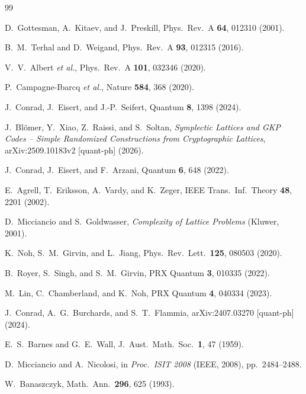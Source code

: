 \documentclass[aps,prl,twocolumn,superscriptaddress]{revtex4-2}
\begin{document}
\begin{thebibliography}{99}

D.~Gottesman, A.~Kitaev, and J.~Preskill,
Phys.~Rev.~A \textbf{64}, 012310 (2001).

B.~M.~Terhal and D.~Weigand,
Phys.~Rev.~A \textbf{93}, 012315 (2016).

V.~V.~Albert \textit{et al.},
Phys.~Rev.~A \textbf{101}, 032346 (2020).

P.~Campagne-Ibarcq \textit{et al.},
Nature \textbf{584}, 368 (2020).

J.~Conrad, J.~Eisert, and J.-P.~Seifert,
Quantum \textbf{8}, 1398 (2024).

J.~Bl\"omer, Y.~Xiao, Z.~Raissi, and S.~Soltan,
\textit{Symplectic Lattices and GKP Codes -- Simple Randomized Constructions from Cryptographic Lattices},
arXiv:2509.10183v2 [quant-ph] (2026).

J.~Conrad, J.~Eisert, and F.~Arzani,
Quantum \textbf{6}, 648 (2022).

E.~Agrell, T.~Eriksson, A.~Vardy, and K.~Zeger,
IEEE Trans.~Inf.~Theory \textbf{48}, 2201 (2002).

D.~Micciancio and S.~Goldwasser,
\textit{Complexity of Lattice Problems} (Kluwer, 2001).

K.~Noh, S.~M.~Girvin, and L.~Jiang,
Phys.~Rev.~Lett.\ \textbf{125}, 080503 (2020).

B.~Royer, S.~Singh, and S.~M.~Girvin,
PRX Quantum \textbf{3}, 010335 (2022).

M.~Lin, C.~Chamberland, and K.~Noh,
PRX Quantum \textbf{4}, 040334 (2023).

J.~Conrad, A.~G.~Burchards, and S.~T.~Flammia,
arXiv:2407.03270 [quant-ph] (2024).

E.~S.~Barnes and G.~E.~Wall,
J.~Aust.~Math.~Soc.\ \textbf{1}, 47 (1959).

D.~Micciancio and A.~Nicolosi,
in \textit{Proc.~ISIT 2008} (IEEE, 2008), pp.~2484--2488.


W.~Banaszczyk,
Math.~Ann.~\textbf{296}, 625 (1993).


\end{thebibliography}
\end{document}
